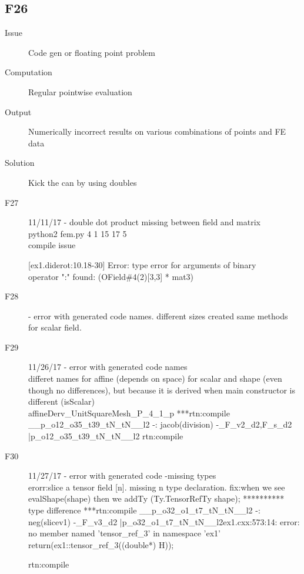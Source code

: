 \subsection{F26}

\begin{description}
\item[Issue] Code gen or floating point problem
\item[Computation] Regular pointwise evaluation
\item[Output] Numerically incorrect results on various combinations of points and FE data
\item[Solution] Kick the can by using doubles
\end{description}


\begin{description}

\item[F27]
 11/11/17
- double dot product missing between field and matrix \\
 python2 fem.py 4 1 15 17  5\\
compile issue\

[ex1.diderot:10.18-30] Error: type error for arguments of binary \\ operator ":"
  found: (OField\#4(2)[3,3] * mat3)
\item [F28]
- error with generated code names.
different sizes created same methods \\
for scalar field.
\item[F29]
11/26/17
- error with generated code names\\
differet names for affine (depends on space) for scalar and shape (even though no differences), but because it is derived when main constructor is different (isScalar)\\
affineDerv\_UnitSquareMesh\_P\_4\_1\_p
***rtn:compile \_\_p\_o12\_o35\_t39\_tN\_tN\_\_l2
	 -: jacob(division)
	-\_F\_v2\_d2,F\_s\_d2 |p\_o12\_o35\_t39\_tN\_tN\_\_l2
	rtn:compile 
\item[F30] 
11/27/17
- error with generated code -missing types\\
erorr:slice a tensor field [n]. missing n type declaration. 
fix:when we see evalShape(shape) then we addTy (Ty.TensorRefTy shape);
********** type difference
***rtn:compile \_\_p\_o32\_o1\_t7\_tN\_tN\_\_l2
	 -: neg(slicev1)
	-\_F\_v3\_d2 |p\_o32\_o1\_t7\_tN\_tN\_\_l2ex1.cxx:573:14: error: no member named 'tensor\_ref\_3' in namespace 'ex1'
        return(ex1::tensor\_ref\_3((double*) H));

	rtn:compile 
\end{description}